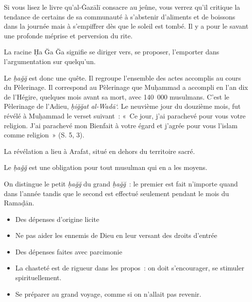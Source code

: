 Si vous lisez le livre qu'al-Ġazālī \label{theol:AlGazali16} consacre au jeûne, vous verrez qu'il
critique la tendance de certains de sa communauté à s'abstenir
d'aliments et de boissons dans la journée mais à s'empiffrer dès que le
soleil est tombé. Il y a pour le savant une profonde méprise et
perversion du rite.




La racine Ḥa Ğa Ğa signifie se diriger vers, se proposer, l'emporter
dans l'argumentation sur quelqu'un.

Le \emph{ḥağğ} est donc une quête. Il regroupe l'ensemble des actes
accomplis au cours du Pèlerinage. Il correspond au Pèlerinage que
Muḥammad a accompli en l'an dix de l'Hégire, quelques mois avant sa
mort, avec 140~000 musulmans. C'est le Pèlerinage de l'Adieu,
\emph{ḥiğğat al-Wadā`.} Le neuvième jour du douzième mois, fut révélé à
Muḥammad le verset suivant~: «~Ce jour, j'ai parachevé pour vous votre
religion. J'ai parachevé mon Bienfait à votre égard et j'agrée pour vous
l'islam comme religion~» (S. 5, 3).

La révélation a lieu à Arafat, situé en dehors du territoire sacré.

Le \emph{ḥaǧǧ} est une obligation pour tout musulman qui en a les
moyens.

On distingue le petit \emph{ḥağğ} du grand \emph{ḥağğ}~: le premier est
fait n'importe quand dans l'année tandis que le second est effectué
seulement pendant le mois du Ramaḍān.


\begin{itemize}
\item
  Des dépenses d'origine licite
\item
  Ne pas aider les ennemis de Dieu en leur versant des droits d'entrée
\item
  Des dépenses faites avec parcimonie
\item
  La chasteté est de rigueur dans les propos~: on doit s'encourager, se
  stimuler spirituellement.
\item
  Se préparer au grand voyage, comme si on n'allait pas revenir.
\end{itemize}

